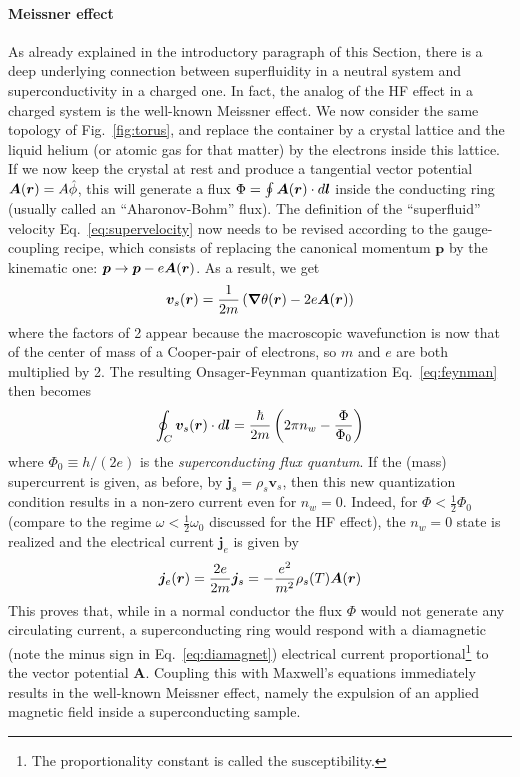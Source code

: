 \paragraph{Meissner effect}
As already explained in the introductory paragraph of this Section,
there is a deep underlying connection between superfluidity in a
neutral system and superconductivity in a charged one. In fact, the
analog of the HF effect in a charged system is the well-known Meissner
effect.
%
We now consider the same topology of Fig.~\ref{fig:torus}, and replace
the container by a crystal lattice and the liquid helium (or atomic
gas for that matter) by the electrons inside this lattice. If we now
keep the crystal at rest and produce a tangential vector potential
$\bm{A}(\bm{r}) = A\hat{\phi}$, this will generate a flux
$\Phi = \oint \bm{A}(\bm{r})\cdot d\bm{l}$ inside the conducting ring
(usually called an ``Aharonov-Bohm''
flux). The definition of the ``superfluid''
velocity Eq.~\eqref{eq:supervelocity} now needs to be revised
according to the gauge-coupling recipe, which consists of replacing
the canonical momentum $\bm{p}$ by the kinematic one:
$\bm{p} \rightarrow \bm{p} - e\bm{A}(\bm{r})$. As a result, we get
%
\begin{equation}\label{eq:superconducting-velocity}
  \bm{v}_s(\bm{r}) = \frac{1}{2m}\left(\bm{\nabla}\theta(\bm{r}) -
    2e\bm{A}(\bm{r})\right)
\end{equation}
% 
where the factors of 2 appear because the macroscopic wavefunction is
now that of the center of mass of a Cooper-pair of electrons, so $m$
and $e$ are both multiplied by 2. The resulting Onsager-Feynman
quantization Eq.~\eqref{eq:feynman} then becomes
%
\begin{equation}\label{eq:superconducting-feynman}
  \oint_C \bm{v}_s(\bm{r}) \cdot d\bm{l} = \frac{\hbar}{2m} \left(2\pi n_w -
    \frac{\Phi}{\Phi_0}\right)
\end{equation}
% 
where $\Phi_0 \equiv h/(2e)$ is the \textit{superconducting flux
  quantum}. If the (mass) supercurrent is given, as before, by
$\bm{j}_s = \rho_s \bm{v}_s$, then this new quantization condition
results in a non-zero current even for $n_w = 0$. Indeed, for
$\Phi < \frac{1}{2} \Phi_0$ (compare to the regime
$\omega < \frac{1}{2}\omega_0$ discussed for the HF effect), the
$n_w = 0$ state is realized and the electrical current $\bm{j}_e$ is
given by
%
\begin{equation}\label{eq:diamagnet}
  \bm{j}_e(\bm{r}) = \frac{2e}{2m}\bm{j}_s = - \frac{e^2}{m^2}\rho_s(T) \bm{A}(\bm{r})
\end{equation}
%
This proves that, while in a normal conductor the flux $\Phi$ would
not generate any circulating current, a superconducting ring would
respond with a diamagnetic (note the minus sign in
Eq.~\eqref{eq:diamagnet}) electrical current proportional\footnote{The
  proportionality constant is called the susceptibility.} to the
vector potential $\bm{A}$. Coupling this with Maxwell's equations
immediately results in the well-known Meissner effect, namely the
expulsion of an applied magnetic field inside a superconducting
sample.


